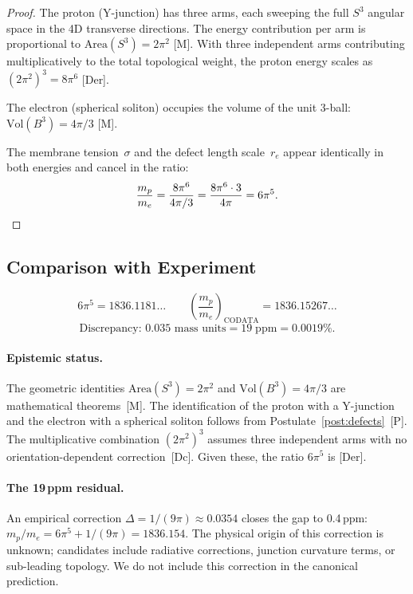 \documentclass[12pt,a4paper]{article}
\theoremstyle{definition}
\theoremstyle{remark}
\newcommand{\tagDer}{\textsf{[Der]}}
\newcommand{\tagDc}{\textsf{[Dc]}}
\newcommand{\tagP}{\textsf{[P]}}
\newcommand{\tagM}{\textsf{[M]}}
\begin{document}
\begin{proof}
The proton (Y-junction) has three arms, each sweeping the full
$S^3$ angular space in the 4D transverse directions.  The energy
contribution per arm is proportional to $\mathrm{Area}(S^3) = 2\pi^2$
\tagM.  With three independent arms contributing multiplicatively to
the total topological weight, the proton energy scales as
$(2\pi^2)^3 = 8\pi^6$ \tagDer.

The electron (spherical soliton) occupies the volume of the unit
3-ball: $\mathrm{Vol}(B^3) = 4\pi/3$ \tagM.

The membrane tension~$\sigma$ and the defect length scale~$r_e$
appear identically in both energies and cancel in the ratio:
\[
  \frac{m_p}{m_e}
    = \frac{8\pi^6}{4\pi/3}
    = \frac{8\pi^6 \cdot 3}{4\pi}
    = 6\pi^5.
  \qedhere
\]
\end{proof}

\subsection{Comparison with Experiment}

\begin{equation}
  6\pi^5 = 1836.1181\ldots
  \qquad
  \left(\frac{m_p}{m_e}\right)_{\mathrm{CODATA}} = 1836.15267\ldots
\end{equation}
\[
  \text{Discrepancy: } 0.035 \text{ mass units} = 19\;\mathrm{ppm}
    = 0.0019\%.
\]

\paragraph{Epistemic status.}
The geometric identities
$\mathrm{Area}(S^3) = 2\pi^2$ and $\mathrm{Vol}(B^3) = 4\pi/3$
are mathematical theorems~\tagM.  The identification of the proton
with a Y-junction and the electron with a spherical soliton follows
from Postulate~\ref{post:defects}~\tagP.  The multiplicative
combination $(2\pi^2)^3$ assumes three independent arms with no
orientation-dependent correction~\tagDc.  Given these, the ratio
$6\pi^5$ is \tagDer.

\paragraph{The 19\,ppm residual.}
An empirical correction $\Delta = 1/(9\pi) \approx 0.0354$ closes
the gap to 0.4\,ppm: $m_p/m_e = 6\pi^5 + 1/(9\pi) = 1836.154$.
The physical origin of this correction is unknown; candidates include
radiative corrections, junction curvature terms, or sub-leading
topology.  We do not include this correction in the canonical
prediction.
\end{document}
